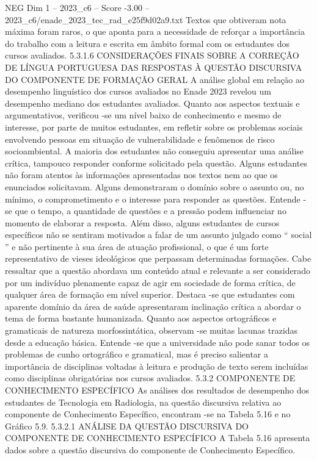 \begin{textsample}{NEG Dim 1 – 2023\_c6 – Score -3.00 – 2023\_c6/enade\_2023\_tec\_rad\_e25f9d02a9.txt}
Textos que obtiveram nota máxima foram raros, o que aponta para a necessidade de reforçar a importância do trabalho com a leitura e escrita em âmbito formal com os estudantes dos cursos avaliados. 5.3.1.6 CONSIDERAÇÕES FINAIS SOBRE A CORREÇÃO DE LÍNGUA PORTUGUESA DAS RESPOSTAS À QUESTÃO DISCURSIVA DO COMPONENTE DE FORMAÇÃO GERAL A análise global em relação ao desempenho linguístico dos cursos avaliados no Enade 2023 revelou um desempenho mediano dos estudantes avaliados.
Quanto aos aspectos textuais e argumentativos, verificou -se um nível baixo de conhecimento e mesmo de interesse, por parte de muitos estudantes, em refletir sobre os problemas sociais envolvendo pessoas em situação de vulnerabilidade e fenômenos de risco socioambiental.
A maioria dos estudantes não conseguiu apresentar uma análise crítica, tampouco responder conforme solicitado pela questão.
Alguns estudantes não foram atentos às informações apresentadas nos textos nem ao que os enunciados solicitavam.
Alguns demonstraram o domínio sobre o assunto ou, no mínimo, o comprometimento e o interesse para responder as questões.
Entende -se que o tempo, a quantidade de questões e a pressão podem influenciar no momento de elaborar a resposta.
Além disso, alguns estudantes de cursos específicos não se sentiram motivados a falar de um assunto julgado como “ social ” e não pertinente à sua área de atuação profissional, o que é um forte representativo de vieses ideológicos que perpassam determinadas formações.
Cabe ressaltar que a questão abordava um conteúdo atual e relevante a ser considerado por um indivíduo plenamente capaz de agir em sociedade de forma crítica, de qualquer área de formação em nível superior.
Destaca -se que estudantes com aparente domínio da área de saúde apresentaram inclinação crítica a abordar o tema de forma bastante humanizada.
Quanto aos aspectos ortográficos e gramaticais de natureza morfossintática, observam -se muitas lacunas trazidas desde a educação básica.
Entende -se que a universidade não pode sanar todos os problemas de cunho ortográfico e gramatical, mas é preciso salientar a importância de disciplinas voltadas à leitura e produção de texto serem incluídas como disciplinas obrigatórias nos cursos avaliados. 5.3.2 COMPONENTE DE CONHECIMENTO ESPECÍFICO As análises dos resultados de desempenho dos estudantes de Tecnologia em Radiologia, na questão discursiva relativa ao componente de Conhecimento Específico, encontram -se na Tabela 5.16 e no Gráfico 5.9. 5.3.2.1 ANÁLISE DA QUESTÃO DISCURSIVA DO COMPONENTE DE CONHECIMENTO ESPECÍFICO A Tabela 5.16 apresenta dados sobre a questão discursiva do componente de Conhecimento Específico.

\end{textsample}
